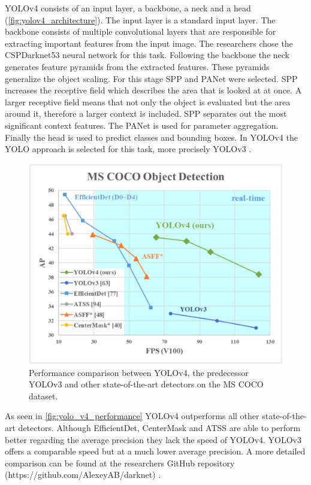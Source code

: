 YOLOv4 consists of an input layer, a backbone, a neck and a head (\autoref{fig:yolov4_architecture}). The input layer is a standard input layer. The backbone consists of multiple convolutional layers that are responsible for extracting important features from the input image. The researchers chose the CSPDarknet53 neural network for this task. Following the backbone the neck generates feature pyramids from the extracted features. These pyramids generalize the object scaling. For this stage \ac{SPP} and \ac{PANet} were selected. \ac{SPP} increases the receptive field which describes the area that is looked at at once. A larger receptive field means that not only the object is evaluated but the area around it, therefore a larger context is included. \ac{SPP} separates out the most significant context features. The \ac{PANet} is used for parameter aggregation. Finally the head is used to predict classes and bounding boxes. In YOLOv4 the \ac{YOLO} approach is selected for this task, more precisely YOLOv3 \autocite{yolov4}.

\begin{figure}[!ht]
\centering
\includegraphics[width=\linewidth]{images/basics/yolo_v4_performance}
\caption{Performance comparison between YOLOv4, the predecessor YOLOv3 and other state-of-the-art detectors on the MS COCO dataset. \autocite{yolov4}}
\label{fig:yolo_v4_performance}
\end{figure}

As seen in \autoref{fig:yolo_v4_performance} YOLOv4 outperforms all other state-of-the-art detectors. Although EfficientDet, CenterMask and ATSS are able to perform better regarding the average precision they lack the speed of YOLOv4. YOLOv3 offers a comparable speed but at a much lower average precision. A more detailed comparison can be found at the researchers GitHub repository (https://github.com/AlexeyAB/darknet) \autocite{yolov4}.

